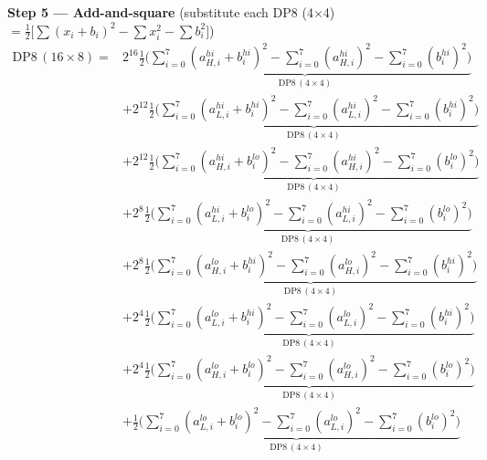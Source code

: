 \documentclass[fleqn]{article}
\newcommand{\DPop}[3]{\mathrm{DP#1}\,(#2\!\times\!#3)}
\begin{document}
\textbf{Step 5 --- Add-and-square}\quad
{\small(substitute each DP8 (4$\times$4) $= \tfrac{1}{2}\big[\sum(x_i{+}b_i)^2 - \sum x_i^2 - \sum b_i^2\big]$)}
\begin{align*}
\DPop{8}{16}{8} = {}
  & 2^{16}\underbrace{\tfrac{1}{2}\Big(\sum_{i=0}^{7}(a_{H,i}^{hi}{+}b_i^{hi})^2 - \sum_{i=0}^{7}(a_{H,i}^{hi})^2 - \sum_{i=0}^{7}(b_i^{hi})^2\Big)}_{\DPop{8}{4}{4}} \\[0.7em]
  & + 2^{12}\underbrace{\tfrac{1}{2}\Big(\sum_{i=0}^{7}(a_{L,i}^{hi}{+}b_i^{hi})^2 - \sum_{i=0}^{7}(a_{L,i}^{hi})^2 - \sum_{i=0}^{7}(b_i^{hi})^2\Big)}_{\DPop{8}{4}{4}} \\[0.7em]
  & + 2^{12}\underbrace{\tfrac{1}{2}\Big(\sum_{i=0}^{7}(a_{H,i}^{hi}{+}b_i^{lo})^2 - \sum_{i=0}^{7}(a_{H,i}^{hi})^2 - \sum_{i=0}^{7}(b_i^{lo})^2\Big)}_{\DPop{8}{4}{4}} \\[0.7em]
  & + 2^{8}\underbrace{\tfrac{1}{2}\Big(\sum_{i=0}^{7}(a_{L,i}^{hi}{+}b_i^{lo})^2 - \sum_{i=0}^{7}(a_{L,i}^{hi})^2 - \sum_{i=0}^{7}(b_i^{lo})^2\Big)}_{\DPop{8}{4}{4}} \\[0.7em]
  & + 2^{8}\underbrace{\tfrac{1}{2}\Big(\sum_{i=0}^{7}(a_{H,i}^{lo}{+}b_i^{hi})^2 - \sum_{i=0}^{7}(a_{H,i}^{lo})^2 - \sum_{i=0}^{7}(b_i^{hi})^2\Big)}_{\DPop{8}{4}{4}} \\[0.7em]
  & + 2^{4}\underbrace{\tfrac{1}{2}\Big(\sum_{i=0}^{7}(a_{L,i}^{lo}{+}b_i^{hi})^2 - \sum_{i=0}^{7}(a_{L,i}^{lo})^2 - \sum_{i=0}^{7}(b_i^{hi})^2\Big)}_{\DPop{8}{4}{4}} \\[0.7em]
  & + 2^{4}\underbrace{\tfrac{1}{2}\Big(\sum_{i=0}^{7}(a_{H,i}^{lo}{+}b_i^{lo})^2 - \sum_{i=0}^{7}(a_{H,i}^{lo})^2 - \sum_{i=0}^{7}(b_i^{lo})^2\Big)}_{\DPop{8}{4}{4}} \\[0.7em]
  & + \underbrace{\tfrac{1}{2}\Big(\sum_{i=0}^{7}(a_{L,i}^{lo}{+}b_i^{lo})^2 - \sum_{i=0}^{7}(a_{L,i}^{lo})^2 - \sum_{i=0}^{7}(b_i^{lo})^2\Big)}_{\DPop{8}{4}{4}}
\end{align*}
\end{document}
